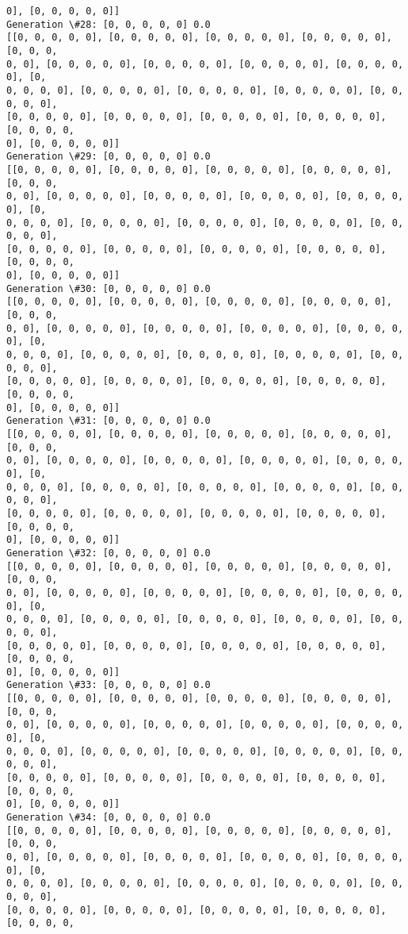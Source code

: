 \documentclass[11pt]{article}
\begin{document}
\begin{Verbatim}[commandchars=\\\{\}]
0], [0, 0, 0, 0, 0]]
Generation \#28: [0, 0, 0, 0, 0] 0.0
[[0, 0, 0, 0, 0], [0, 0, 0, 0, 0], [0, 0, 0, 0, 0], [0, 0, 0, 0, 0], [0, 0, 0,
0, 0], [0, 0, 0, 0, 0], [0, 0, 0, 0, 0], [0, 0, 0, 0, 0], [0, 0, 0, 0, 0], [0,
0, 0, 0, 0], [0, 0, 0, 0, 0], [0, 0, 0, 0, 0], [0, 0, 0, 0, 0], [0, 0, 0, 0, 0],
[0, 0, 0, 0, 0], [0, 0, 0, 0, 0], [0, 0, 0, 0, 0], [0, 0, 0, 0, 0], [0, 0, 0, 0,
0], [0, 0, 0, 0, 0]]
Generation \#29: [0, 0, 0, 0, 0] 0.0
[[0, 0, 0, 0, 0], [0, 0, 0, 0, 0], [0, 0, 0, 0, 0], [0, 0, 0, 0, 0], [0, 0, 0,
0, 0], [0, 0, 0, 0, 0], [0, 0, 0, 0, 0], [0, 0, 0, 0, 0], [0, 0, 0, 0, 0], [0,
0, 0, 0, 0], [0, 0, 0, 0, 0], [0, 0, 0, 0, 0], [0, 0, 0, 0, 0], [0, 0, 0, 0, 0],
[0, 0, 0, 0, 0], [0, 0, 0, 0, 0], [0, 0, 0, 0, 0], [0, 0, 0, 0, 0], [0, 0, 0, 0,
0], [0, 0, 0, 0, 0]]
Generation \#30: [0, 0, 0, 0, 0] 0.0
[[0, 0, 0, 0, 0], [0, 0, 0, 0, 0], [0, 0, 0, 0, 0], [0, 0, 0, 0, 0], [0, 0, 0,
0, 0], [0, 0, 0, 0, 0], [0, 0, 0, 0, 0], [0, 0, 0, 0, 0], [0, 0, 0, 0, 0], [0,
0, 0, 0, 0], [0, 0, 0, 0, 0], [0, 0, 0, 0, 0], [0, 0, 0, 0, 0], [0, 0, 0, 0, 0],
[0, 0, 0, 0, 0], [0, 0, 0, 0, 0], [0, 0, 0, 0, 0], [0, 0, 0, 0, 0], [0, 0, 0, 0,
0], [0, 0, 0, 0, 0]]
Generation \#31: [0, 0, 0, 0, 0] 0.0
[[0, 0, 0, 0, 0], [0, 0, 0, 0, 0], [0, 0, 0, 0, 0], [0, 0, 0, 0, 0], [0, 0, 0,
0, 0], [0, 0, 0, 0, 0], [0, 0, 0, 0, 0], [0, 0, 0, 0, 0], [0, 0, 0, 0, 0], [0,
0, 0, 0, 0], [0, 0, 0, 0, 0], [0, 0, 0, 0, 0], [0, 0, 0, 0, 0], [0, 0, 0, 0, 0],
[0, 0, 0, 0, 0], [0, 0, 0, 0, 0], [0, 0, 0, 0, 0], [0, 0, 0, 0, 0], [0, 0, 0, 0,
0], [0, 0, 0, 0, 0]]
Generation \#32: [0, 0, 0, 0, 0] 0.0
[[0, 0, 0, 0, 0], [0, 0, 0, 0, 0], [0, 0, 0, 0, 0], [0, 0, 0, 0, 0], [0, 0, 0,
0, 0], [0, 0, 0, 0, 0], [0, 0, 0, 0, 0], [0, 0, 0, 0, 0], [0, 0, 0, 0, 0], [0,
0, 0, 0, 0], [0, 0, 0, 0, 0], [0, 0, 0, 0, 0], [0, 0, 0, 0, 0], [0, 0, 0, 0, 0],
[0, 0, 0, 0, 0], [0, 0, 0, 0, 0], [0, 0, 0, 0, 0], [0, 0, 0, 0, 0], [0, 0, 0, 0,
0], [0, 0, 0, 0, 0]]
Generation \#33: [0, 0, 0, 0, 0] 0.0
[[0, 0, 0, 0, 0], [0, 0, 0, 0, 0], [0, 0, 0, 0, 0], [0, 0, 0, 0, 0], [0, 0, 0,
0, 0], [0, 0, 0, 0, 0], [0, 0, 0, 0, 0], [0, 0, 0, 0, 0], [0, 0, 0, 0, 0], [0,
0, 0, 0, 0], [0, 0, 0, 0, 0], [0, 0, 0, 0, 0], [0, 0, 0, 0, 0], [0, 0, 0, 0, 0],
[0, 0, 0, 0, 0], [0, 0, 0, 0, 0], [0, 0, 0, 0, 0], [0, 0, 0, 0, 0], [0, 0, 0, 0,
0], [0, 0, 0, 0, 0]]
Generation \#34: [0, 0, 0, 0, 0] 0.0
[[0, 0, 0, 0, 0], [0, 0, 0, 0, 0], [0, 0, 0, 0, 0], [0, 0, 0, 0, 0], [0, 0, 0,
0, 0], [0, 0, 0, 0, 0], [0, 0, 0, 0, 0], [0, 0, 0, 0, 0], [0, 0, 0, 0, 0], [0,
0, 0, 0, 0], [0, 0, 0, 0, 0], [0, 0, 0, 0, 0], [0, 0, 0, 0, 0], [0, 0, 0, 0, 0],
[0, 0, 0, 0, 0], [0, 0, 0, 0, 0], [0, 0, 0, 0, 0], [0, 0, 0, 0, 0], [0, 0, 0, 0,

\end{Verbatim}
\end{document}
